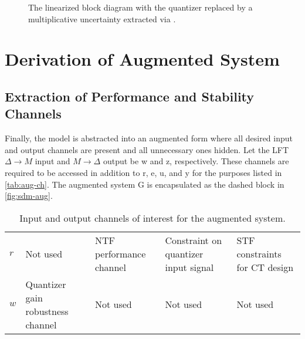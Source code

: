 \begin{figure}[h]
\begin{tikzpicture}[ampersand replacement=\&,scale=0.75, every node/.style={scale=0.75}]
	\end{tikzpicture}
	\caption{The linearized block diagram with the quantizer replaced by a multiplicative uncertainty extracted via .} \label{fig:sdm-stdf-lft}
\end{figure}

\section{Derivation of Augmented System}

\subsection{Extraction of Performance and Stability Channels}

Finally, the model is abstracted into an augmented form where all desired input and output channels are present and all unnecessary ones hidden. Let the \gls{LFT} $\Delta \rightarrow M$ input and $M \rightarrow \Delta$ output be \gls{w} and \gls{z}, respectively. These channels are required to be accessed in addition to \gls{r}, \gls{e}, \gls{u}, and \gls{y} for the purposes listed in \autoref{tab:aug-ch}. The augmented system \gls{G} is encapsulated as the dashed block in \autoref{fig:sdm-aug}.

\begin{table}[t]
	\centering
	\caption{Input and output channels of interest for the augmented system.} \label{tab:aug-ch}
	\begin{tabular}{>{\centering\arraybackslash}m{1.6cm} | >{\RaggedRight}m{2cm} >{\RaggedRight}m{2.25cm} >{\RaggedRight}m{2.25cm} >{\RaggedRight}m{2cm}}
		\toprule
		\diagbox[width=2cm, height=1cm]{\textbf{Input}}{\textbf{Output}} & \multicolumn{1}{c}{$z$} & \multicolumn{1}{c}{$e$} & \multicolumn{1}{c}{$u$} & \multicolumn{1}{c}{$y$} \\
		\midrule
		$r$ & Not used & \gls{NTF} performance channel & Constraint on quantizer input signal & \gls{STF} constraints for \gls{CT} design \\
		$w$ & Quantizer gain robustness channel & Not used & Not used & Not used \\
		\bottomrule
	\end{tabular}
\end{table}


